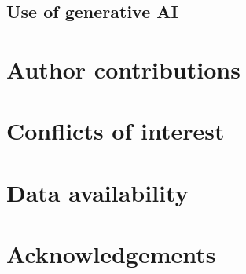 \listoftodos



\subsection*{Use of generative AI}






\section*{Author contributions}


\section*{Conflicts of interest}


\section*{Data availability}


\section*{Acknowledgements}



\balance




